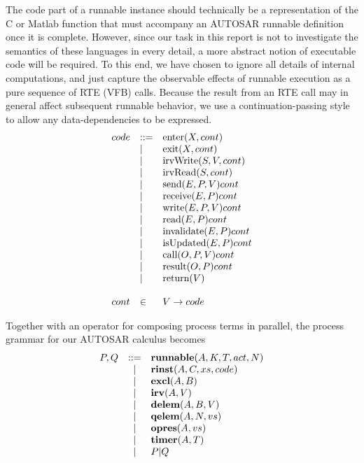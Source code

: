 \documentclass[twocolumn]{article}
\begin{document}
The code part of a runnable instance should technically be a representation of the C or Matlab function that must accompany an AUTOSAR runnable definition once it is complete. However, since our task in this report is not to investigate the semantics of these languages in every detail, a more abstract notion of executable code will be required. To this end, we have chosen to ignore all details of internal computations, and just capture the observable effects of runnable execution as a pure sequence of RTE (VFB) calls. Because the result from an RTE call may in general affect subsequent runnable behavior, we use a continuation-passing style to allow any data-dependencies to be expressed.
\[
\begin{array}{lll}
	\Code	& ::=	& \Enter{X}{\Cont}			\\
			& |	& \Exit{X}{\Cont}			\\
			& |	& \IrvWrite{S}{V}{\Cont}		\\
			& |	& \IrvRead{S}{\Cont}			\\
			& |	& \Send{E}{P}{V}{\Cont}		\\
			& |	& \Receive{E}{P}{\Cont}		\\
			& |	& \Write{E}{P}{V}{\Cont}		\\
			& |	& \Read{E}{P}{\Cont}		\\
			& |	& \Invalidate{E}{P}{\Cont}		\\
			& |	& \IsUpdated{E}{P}{\Cont}		\\
			& |	& \Call{O}{P}{V}{\Cont}		\\
			& |	& \Result{O}{P}{\Cont}		\\
			& |	& \Return{V}				\\
	\\
	\Cont	& \in	& V \rightarrow \Code		\\
\end{array}
\]

Together with an operator for composing process terms in parallel, the process grammar for our AUTOSAR calculus becomes
\[
\begin{array}{rcll}
	P,Q 	& ::= &
		\Trunnable{A}{K}{T}{\Act}{N}	\\
		& | &
		\Trinst{A}{C}{\Xs}{\Code}	\\
		& | &
		\Texcl{A}{B}			\\
		& | &
		\Tirv{A}{V}				\\
		& | &
		\Tdelem{A}{B}{V}			\\
		& | &
		\Tqelem{A}{N}{\Vs}			\\
		& | &
		\Topres{A}{\Vs}			\\
		& | &
		\Ttimer{A}{T}		\\
		& | &
		P|Q					\\
\end{array}
\]
\end{document}
